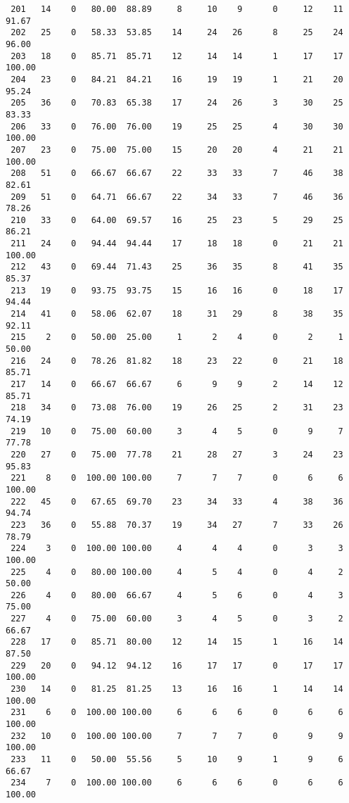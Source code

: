 \begin{verbatim}
 201   14    0   80.00  88.89     8     10    9      0     12    11    91.67
 202   25    0   58.33  53.85    14     24   26      8     25    24    96.00
 203   18    0   85.71  85.71    12     14   14      1     17    17   100.00
 204   23    0   84.21  84.21    16     19   19      1     21    20    95.24
 205   36    0   70.83  65.38    17     24   26      3     30    25    83.33
 206   33    0   76.00  76.00    19     25   25      4     30    30   100.00
 207   23    0   75.00  75.00    15     20   20      4     21    21   100.00
 208   51    0   66.67  66.67    22     33   33      7     46    38    82.61
 209   51    0   64.71  66.67    22     34   33      7     46    36    78.26
 210   33    0   64.00  69.57    16     25   23      5     29    25    86.21
 211   24    0   94.44  94.44    17     18   18      0     21    21   100.00
 212   43    0   69.44  71.43    25     36   35      8     41    35    85.37
 213   19    0   93.75  93.75    15     16   16      0     18    17    94.44
 214   41    0   58.06  62.07    18     31   29      8     38    35    92.11
 215    2    0   50.00  25.00     1      2    4      0      2     1    50.00
 216   24    0   78.26  81.82    18     23   22      0     21    18    85.71
 217   14    0   66.67  66.67     6      9    9      2     14    12    85.71
 218   34    0   73.08  76.00    19     26   25      2     31    23    74.19
 219   10    0   75.00  60.00     3      4    5      0      9     7    77.78
 220   27    0   75.00  77.78    21     28   27      3     24    23    95.83
 221    8    0  100.00 100.00     7      7    7      0      6     6   100.00
 222   45    0   67.65  69.70    23     34   33      4     38    36    94.74
 223   36    0   55.88  70.37    19     34   27      7     33    26    78.79
 224    3    0  100.00 100.00     4      4    4      0      3     3   100.00
 225    4    0   80.00 100.00     4      5    4      0      4     2    50.00
 226    4    0   80.00  66.67     4      5    6      0      4     3    75.00
 227    4    0   75.00  60.00     3      4    5      0      3     2    66.67
 228   17    0   85.71  80.00    12     14   15      1     16    14    87.50
 229   20    0   94.12  94.12    16     17   17      0     17    17   100.00
 230   14    0   81.25  81.25    13     16   16      1     14    14   100.00
 231    6    0  100.00 100.00     6      6    6      0      6     6   100.00
 232   10    0  100.00 100.00     7      7    7      0      9     9   100.00
 233   11    0   50.00  55.56     5     10    9      1      9     6    66.67
 234    7    0  100.00 100.00     6      6    6      0      6     6   100.00

\end{verbatim}

